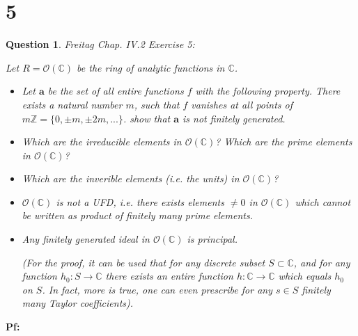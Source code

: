 \documentclass{article}
\newtheorem{question}{Question}
\begin{document}
\section*{5}
\begin{myBox}[]{}
    \begin{question}
        Freitag Chap. IV.2 Exercise 5:

        Let $R=\mathcal{O}(\mathbb{C})$ be the ring of analytic functions in $\mathbb{C}$.
        \begin{itemize}
            \item[(a)] Let $\textbf{a}$ be the set of all entire functions $f$ with the following property.
            There exists a natural number $m$, such that $f$ vanishes at all points of $m\mathbb{Z}=\{0,\pm m,\pm 2m,...\}$.
            show that $\textbf{a}$ is not finitely generated.
            \item[(b)] Which are the irreducible elements in $\mathcal{O}(\mathbb{C})$? Which are the prime elements in $\mathcal{O}(\mathbb{C})$?
            \item[(c)] Which are the inverible elements (i.e. the units) in $\mathcal{O}(\mathbb{C})$?
            \item[(d)] $\mathcal{O}(\mathbb{C})$ is not a UFD, i.e. there exists elements $\neq 0$ in $\mathcal{O}(\mathbb{C})$ which cannot be written as product of finitely many prime elements.
            \item[(e)] Any finitely generated ideal in $\mathcal{O}(\mathbb{C})$ is principal.
            
            (For the proof, it can be used that for any discrete subset $S\subset\mathbb{C}$, and for
            any function $h_0:S\rightarrow\mathbb{C}$ there exists an entire function $h:\mathbb{C}\rightarrow\mathbb{C}$ which
            equals $h_0$ on $S$. In fact, more is true, one can even prescribe for any $s\in S$
            finitely many Taylor coefficients).
        \end{itemize}
    \end{question}
\end{myBox}

\textbf{Pf:}
\end{document}
